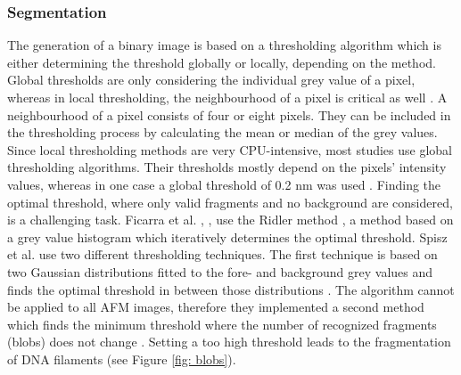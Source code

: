 \documentclass{article}
\begin{document}
\subsubsection{Segmentation}
The generation of a binary image is based on a thresholding algorithm which is either determining the threshold globally or locally, depending on the method. Global thresholds are only considering the individual grey value of a pixel, whereas in local thresholding, the neighbourhood of a pixel is critical as well  \cite{weszka1978survey}. A neighbourhood of a pixel consists of four or eight pixels. They can be included in the thresholding process by calculating the mean or median of the grey values. Since local thresholding methods are very CPU-intensive, most studies use global thresholding algorithms. Their thresholds mostly depend on the pixels’ intensity values, whereas in one case a global threshold of 0.2 nm was used  \cite{sanchez2002accuracy}. Finding the optimal threshold, where only valid fragments and no background are considered, is a challenging task. Ficarra et al. \cite{ficarra2005automated}, \cite{ficarra2005automatic}, \cite{ficarra2002automated} use the Ridler method \cite{ridler1978picture}, a method based on a grey value histogram which iteratively determines the optimal threshold. Spisz et al. \cite{spisz1998automated} use two different thresholding techniques. The first technique is based on two Gaussian distributions fitted to the fore- and background grey values and finds the optimal threshold in between those distributions  \cite{gonzales1987wintz}. The algorithm cannot be applied to all AFM images, therefore they implemented a second method which finds the minimum threshold where the number of recognized fragments (blobs) does not change  \cite{russ1992image}. Setting a too high threshold leads to the fragmentation of DNA filaments (see Figure \ref{fig: blobs}).
\end{document}
